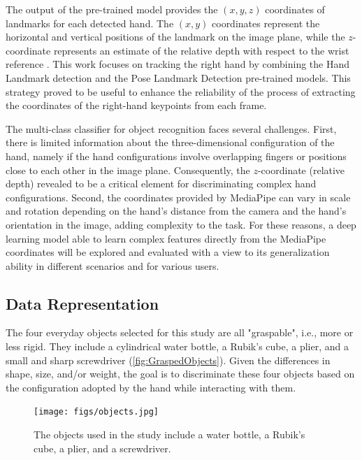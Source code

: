 The output of the pre-trained model provides the $(x,y,z)$ coordinates of landmarks for each detected hand. The $(x,y)$ coordinates represent the horizontal and vertical positions of the landmark on the image plane, while the $z$-coordinate represents an estimate of the relative depth with respect to the wrist reference \cite{Amprimo2023}. This work focuses on tracking the right hand by combining the Hand Landmark detection and the Pose Landmark Detection pre-trained models. This strategy proved to be useful to enhance the reliability of the process of extracting the coordinates of the right-hand keypoints from each frame.

The multi-class classifier for object recognition faces several challenges. First, there is limited information about the three-dimensional configuration of the hand, namely if the hand configurations involve overlapping fingers or positions close to each other in the image plane. Consequently, the $z$-coordinate (relative depth) revealed to be a critical element for discriminating complex hand configurations. Second, the coordinates provided by MediaPipe can vary in scale and rotation depending on the hand’s distance from the camera and the hand’s orientation in the image, adding complexity to the task. For these reasons, a deep learning model able to learn complex features directly from the MediaPipe coordinates will be explored and evaluated with a view to its generalization ability in different scenarios and for various users.

\subsection{Data Representation}
\label{section:data_representation}

The four everyday objects selected for this study are all "graspable", i.e., more or less rigid. They include a cylindrical water bottle, a Rubik’s cube, a plier, and a small and sharp screwdriver (\autoref{fig:GraspedObjects}). Given the differences in shape, size, and/or weight, the goal is to discriminate these four objects based on the configuration adopted by the hand while interacting with them.

\begin{figure}[ht]
\captionsetup{width=0.7\textwidth}
\centering
\texttt{[image: figs/objects.jpg]}
\caption{The objects used in the study include a water bottle, a Rubik’s cube, a plier, and a screwdriver.}
\label{fig:GraspedObjects}
\end{figure}


